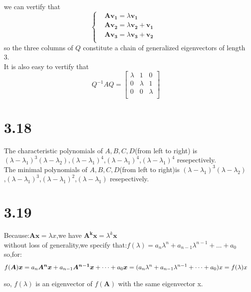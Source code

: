 \documentclass{article}
\begin{document}
we can vertify that 
\[
\left\{
\begin{aligned}
&\boldsymbol{Av_1}=\lambda\boldsymbol{v_1}&\\
&\boldsymbol{Av_2}=\lambda\boldsymbol{v_2}+\boldsymbol{v_1}&\\
&\boldsymbol{Av_3}=\lambda\boldsymbol{v_3}+\boldsymbol{v_2}&\\
\end{aligned}
\right.
\]
so the three columns of $Q$ constitute a chain of generalized eigenvectors of length 3.\\
It is also easy to vertify that 
\[Q^{-1}AQ=
\left[
\begin{array}{ccc}
\lambda & 1 & 0\\
0 & \lambda & 1\\
0 & 0 & \lambda\\
\end{array}
\right]
\]

\section*{3.18}
The characteristic polynomials of $A,B,C,D$(from left to right) is 
$(\lambda-\lambda_1)^3(\lambda-\lambda_2)$,$(\lambda-\lambda_1)^4$,$(\lambda-\lambda_1)^4$,$(\lambda-\lambda_1)^4$
resepectively.\\

The minimal polynomials of $A,B,C,D$(from left to right)is
$(\lambda-\lambda_1)^3(\lambda-\lambda_2)$,$(\lambda-\lambda_1)^3$,$(\lambda-\lambda_1)^2$,$(\lambda-\lambda_1)$
resepectively.

\section*{3.19}
Because:$\boldsymbol{Ax}=\lambda x$,we have $\boldsymbol{A^kx}=\lambda^k\boldsymbol{x}$\\

without loss of generality,we specify that:$f(\lambda)=a_n\lambda^n+a_{n-1}\lambda^{n-1}+...+a_0$\\

so,for:
\[f(\boldsymbol{A}) \boldsymbol{x}=
a_n \boldsymbol{A^nx}+a_{n-1} \boldsymbol{A^{n-1}x}+\cdots+a_0 \boldsymbol{x}
=\\
(a_n\lambda^n+a_{n-1}\lambda^{n-1}+\cdots+a_0)x
=f(\lambda)x\]

so, $f(\lambda)$ is an eigenvector of $f(\boldsymbol{A})$ with the same eigenvector x.
\end{document}
